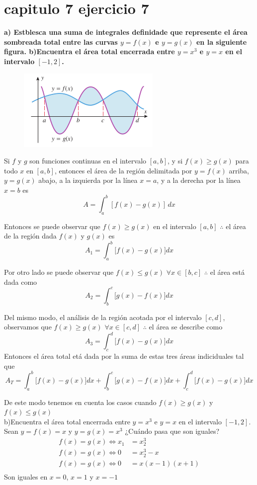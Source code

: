 \chapter*{capitulo 7 ejercicio 7}
\textbf{a) Estblesca una suma de integrales definidade que represente el área sombreada total entre las curvas $y=f(x)$ e $y=g(x)$ en la siguiente figura. b)Encuentra el área total encerrada entre $y=x^3$ e $y=x$ en el intervalo $[-1, 2]$.}
\begin{figure}[!hbt]
	\includegraphics[height = 0.20\textheight]{recursos/image.png}\par
\end{figure}

Si \( f \) y \( g \) son funciones continuas en el intervalo \([a, b]\), y si \( f(x) \geq g(x) \) para todo \( x \) en \([a, b]\), entonces el área de la región delimitada por \( y = f(x) \) arriba, \( y = g(x) \) abajo, a la izquierda por la línea \( x = a \), y a la derecha por la línea \( x = b \) es \[ A = \int_{a}^{b} [f(x) - g(x)] \, dx \]

Entonces se puede observar que $f(x)\geq g(x)$ en el intervalo $[a,b]$ $\therefore$ el área de la región dada  $f(x)$ y $ g(x)$ es $$A_1=\int_{a}^{b}\bigg[f(x)-g(x)\bigg]dx$$

Por otro lado se puede observar que $f(x)\leq g(x)$ $\forall x\in[b,c]$ $\therefore$ el área está dada como $$A_2=\int_{b}^{c}\bigg[g(x)-f(x)\bigg]dx$$

Del mismo modo, el análisis de la región acotada por el intervalo $[c,d]$, observamos que $f(x)\geq g(x)$ $\forall x\in[c,d]$ $\therefore$ el área se describe como $$A_3=\int_{c}^{d}\bigg[f(x)-g(x)\bigg]dx$$
Entonces el área total etá dada por la suma de estas tres áreas indiciduales tal que
$$A_T=\int_{a}^{b}\bigg[f(x)-g(x)\bigg]dx + \int_{b}^{c}\bigg[g(x)-f(x)\bigg]dx + \int_{c}^{d}\bigg[f(x)-g(x)\bigg]dx$$

De este modo tenemos en cuenta los casos cuando $f(x)\geq g(x)$ y $f(x)\leq g(x)$
\\
b)Encuentra el área total encerrada entre $y=x^3$ e $y=x$ en el intervalo $[-1, 2]$.
Sean $y=f(x)=x$ y $y=g(x)=x^3$
¿Cuándo pasa que son iguales?
\begin{align*}
	f(x)=g(x)\iff x_1 & =x_2^3       \\
	f(x)=g(x)\iff 0   & =x_2^3-x     \\
	f(x)=g(x)\iff 0   & =x(x-1)(x+1) \\
\end{align*}
Son iguales en $x=0$, $x=1$ y $x=-1$

